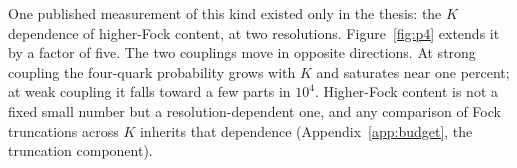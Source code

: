 One published measurement of this kind existed only in the thesis: the
$K$ dependence of higher-Fock content, at two resolutions.
Figure~\ref{fig:p4} extends it by a factor of five.  The two couplings
move in opposite directions.  At strong coupling the four-quark
probability grows with $K$ and saturates near one percent; at weak
coupling it falls toward a few parts in $10^4$.  Higher-Fock content is
not a fixed small number but a resolution-dependent one, and any
comparison of Fock truncations across $K$ inherits that dependence
(Appendix~\ref{app:budget}, the truncation component).
